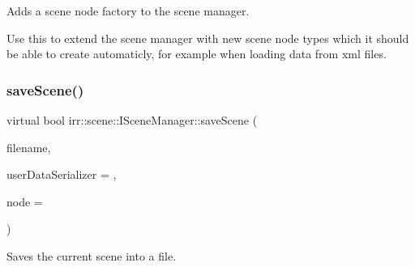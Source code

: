 Adds a scene node factory to the scene manager. 

Use this to extend the scene manager with new scene node types which it should be able to create automaticly, for example when loading data from xml files. \mbox{\label{classirr_1_1scene_1_1ISceneManager_a6dd059e96ff4f7233b7ba1ed7e39c337}} 
\subsubsection{\texorpdfstring{save\+Scene()}{saveScene()}\hspace{0.1cm}{\footnotesize\ttfamily [1/6]}}
{\footnotesize\ttfamily virtual bool irr\+::scene\+::\+I\+Scene\+Manager\+::save\+Scene (\begin{DoxyParamCaption}\item[{const \hyperlink{namespaceirr_1_1io_a6468281622ce3a1c46b72e19f32dded5}{io\+::path} \&}]{filename,  }\item[{\hyperlink{classirr_1_1scene_1_1ISceneUserDataSerializer}{I\+Scene\+User\+Data\+Serializer} $\ast$}]{user\+Data\+Serializer = {},  }\item[{\hyperlink{classirr_1_1scene_1_1ISceneNode}{I\+Scene\+Node} $\ast$}]{node = {} }\end{DoxyParamCaption})\hspace{0.3cm}{\ttfamily [pure virtual]}}



Saves the current scene into a file. 

